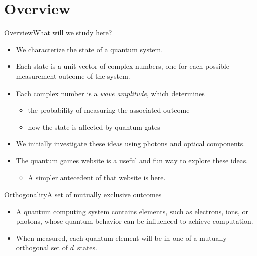 
\section{Overview}

\begin{frame}{Overview}{What will we study here?}
\begin{itemize}
    \item We characterize the state of a quantum system.
    \item Each state is a unit vector of complex numbers, one for each possible measurement outcome of the system.
    \item Each complex number is a \emph{wave amplitude}, which determines
    \begin{itemize}
        \item the probability of measuring the associated outcome
        \item how the state is affected by quantum gates
    \end{itemize}
    \item We initially investigate these ideas using photons and optical components.
    \item The \href{https://lab.quantumflytrap.com/lab}{quantum games} website is a useful and fun way to explore these ideas.
    \begin{itemize}
        \item A simpler antecedent of that website is \href{http://play.quantumgame.io/}{here}.
    \end{itemize}
    
    
\end{itemize}
    
\end{frame}

\begin{frame}{Orthogonality}{A set of mutually exclusive outcomes}
\begin{itemize}
    \item A quantum computing system contains elements, such as electrons, ions, or photons, whose quantum behavior can be influenced to achieve computation.
    \item When measured, each quantum element will be in one of a mutually orthogonal set of $d$~states.
    
\end{itemize}
\end{frame}

